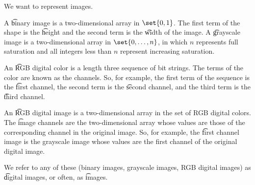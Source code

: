 

We want to represent images.


A \t{binary image} is a two-dimensional array in $\set{0, 1}$.
The first term of the shape is the \t{height} and the second term is the \t{width} of the image.
A \t{grayscale image} is a two-dimensional array in $\set{0, \dots, n}$, in which $n$ represents full saturation and all integers less than $n$ represent increasing saturation.

An \t{RGB digital color} is a length three sequence of bit strings.
The terms of the color are known as the channels.
So, for example, the first term of the sequence is the \t{first channel}, the second term is the \t{second channel}, and the third term is the \t{third channel}.

An \t{RGB digital image} is a two-dimensional array in the set of RGB digital colors.
The \t{image channels} are the two-dimensional array whose values are those of the corresponding channel in the original image.
So, for example, the \t{first channel image} is the grayscale image whose values are the first channel of the original digital image.

We refer to any of these (binary images, grayscale images, RGB digital images) as \t{digital images}, or often, as \t{images}.

\blankpage
